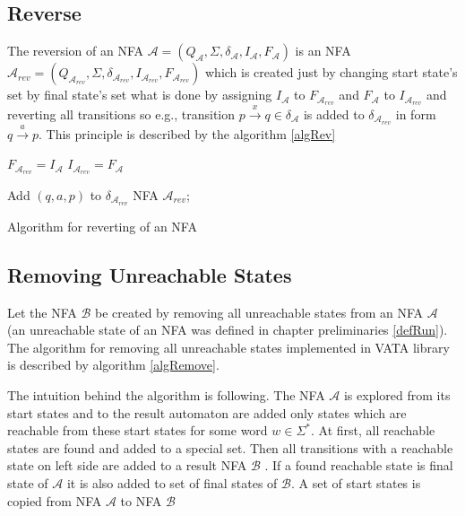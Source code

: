 \subsection{Reverse}
The reversion of an NFA $\mathcal{A}=(Q_\mathcal{A},\Sigma,\delta_\mathcal{A},I_\mathcal{A},F_\mathcal{A})$ is an NFA 
$\mathcal{A}_{rev}=(Q_{\mathcal{A}_{rev}},\Sigma,\delta_{\mathcal{A}_{rev}},I_{\mathcal{A}_{rev}},F_{\mathcal{A}_{rev}})$ 
which is created just by changing start state's set by final state's set what is done by
assigning $I_\mathcal{A}$ to $F_{\mathcal{A}_{rev}}$ and $F_\mathcal{A}$ to $I_{\mathcal{A}_{rev}}$ and reverting all transitions  so e.g., transition
$p\xrightarrow{x}q \in \delta_\mathcal{A}$ is added to $\delta_{\mathcal{A}_{rev}}$ in form $q\xrightarrow{a}p$. This principle is described by the algorithm
\ref{algRev}
\\

\begin{algorithm}[H]
	\label{algRev}

  
  $F_{\mathcal{A}_{rev}}=I_\mathcal{A}$\; 
  $I_{\mathcal{A}_{rev}}=F_\mathcal{A}$\;

   {
    Add $(q,a,p)$ to $\delta_{\mathcal{A}_{rev}}$\;
  }
	\Return NFA $\mathcal{A}_{rev}$;
	\caption{Algorithm for reverting of an NFA}
\end{algorithm}

\subsection{Removing Unreachable States}
Let the NFA $\mathcal{B}$ be created by removing all unreachable states from an NFA $\mathcal{A}$ (an unreachable state of an NFA was defined in
chapter preliminaries \ref{defRun}). The algorithm for removing all unreachable states implemented in VATA library is described by algorithm \ref{algRemove}.

The intuition behind the algorithm is following. The NFA $\mathcal{A}$ is explored from its start states and to the result automaton 
are added only states which are
reachable from these start states for some word $w \in \Sigma^{*}$. At first, all reachable states are found and added to a special set. 
Then all transitions with a reachable state on left side are added to a result NFA $\mathcal{B}$ .
If a found reachable state is final state of 
$\mathcal{A}$ it is also added to set of final states of $\mathcal{B}$. A set of start states is copied from
NFA $\mathcal{A}$ to NFA $\mathcal{B}$

